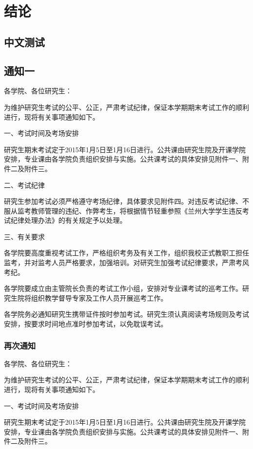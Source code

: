 
\chapter{结论}
\section{中文测试}
\pkuthssffaq

\section{通知一}

各学院、各位研究生：

为维护研究生考试的公平、公正，严肃考试纪律，保证本学期期末考试工作的顺利进行，现将有关事项通知如下。

一、考试时间及考场安排

研究生期末考试定于2015年1月5日至1月16日进行。公共课由研究生院及开课学院安排，专业课由各学院负责组织安排与实施。公共课考试的具体安排见附件一、附件二及附件三。

二、考试纪律

研究生参加考试必须严格遵守考场纪律，具体要求见附件四。对违反考试纪律、不服从监考教师管理的违纪、作弊考生，将根据情节轻重参照《兰州大学学生违反考试纪律处理办法》的有关规定予以处理。

三、有关要求

各学院要高度重视考试工作，严格组织考务及有关工作，组织我校正式教职工担任监考，并对监考人员严格要求，加强培训。对研究生加强考试纪律要求，严肃考风考纪。

各学院要成立由主管院长负责的考试工作小组，安排对专业课考试的巡考工作。研究生院将组织教学督导专家及工作人员开展巡考工作。

各学院务必通知研究生携带证件按时参加考试。研究生须认真阅读考场规则及考试安排，按要求时间地点准时参加考试，以免耽误考试。

\subsection{再次通知}
各学院、各位研究生：

为维护研究生考试的公平、公正，严肃考试纪律，保证本学期期末考试工作的顺利进行，现将有关事项通知如下。

一、考试时间及考场安排

研究生期末考试定于2015年1月5日至1月16日进行。公共课由研究生院及开课学院安排，专业课由各学院负责组织安排与实施。公共课考试的具体安排见附件一、附件二及附件三。

